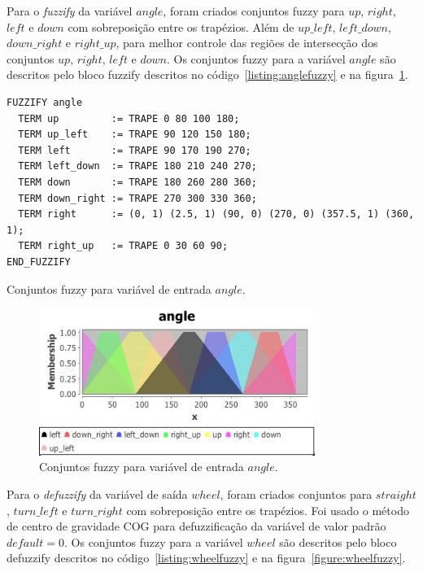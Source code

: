\documentclass[12pt, a4paper]{article}
\begin{document}
Para o \textit{fuzzify} da variável $angle$, foram criados conjuntos fuzzy para $up$, $right$, $left$ e $down$ com sobreposição entre os trapézios.
Além de $up\_left$, $left\_down$, $down\_right$ e $right\_up$, para melhor controle das regiões de intersecção dos conjuntos $up$, $right$, $left$ e $down$.
Os conjuntos fuzzy para a variável $angle$ são descritos pelo bloco fuzzify descritos no código~\ref{listing:anglefuzzy} e na figura~\ref{figure:anglefuzzy}.

\begin{listing}[h!]
  \begin{verbatim}
FUZZIFY angle
  TERM up         := TRAPE 0 80 100 180;
  TERM up_left    := TRAPE 90 120 150 180;
  TERM left       := TRAPE 90 170 190 270;
  TERM left_down  := TRAPE 180 210 240 270;
  TERM down       := TRAPE 180 260 280 360;
  TERM down_right := TRAPE 270 300 330 360;
  TERM right      := (0, 1) (2.5, 1) (90, 0) (270, 0) (357.5, 1) (360, 1);
  TERM right_up   := TRAPE 0 30 60 90;
END_FUZZIFY
  \end{verbatim}
  \caption{Conjuntos fuzzy para variável de entrada $angle$.}\label{listing:anglefuzzy}
\end{listing}

\begin{figure}[h!]
  \centering
  \includegraphics[width=0.8\textwidth]{assets/angle.jpg}
  \caption{Conjuntos fuzzy para variável de entrada $angle$.}\label{figure:anglefuzzy}
\end{figure}

Para o \textit{defuzzify} da variável de saída $wheel$, foram criados conjuntos para $straight$, $turn\_left$ e $turn\_right$ com sobreposição entre os trapézios.
Foi usado o método de centro de gravidade COG para defuzzificação da variável de valor padrão $default = 0$.
Os conjuntos fuzzy para a variável $wheel$ são descritos pelo bloco defuzzify descritos no código~\ref{listing:wheelfuzzy} e na figura~\ref{figure:wheelfuzzy}.
\end{document}
